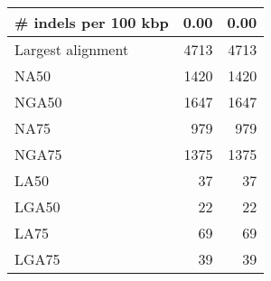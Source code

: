 \documentclass[12pt,a4paper]{article}
\begin{document}
\begin{table}[ht]
\begin{center}
\begin{tabular}{|l*{2}{|r}|}
\# indels per 100 kbp & 0.00 & 0.00 \\ \hline
Largest alignment & 4713 & 4713 \\ \hline
NA50 & 1420 & 1420 \\ \hline
NGA50 & 1647 & 1647 \\ \hline
NA75 & 979 & 979 \\ \hline
NGA75 & 1375 & 1375 \\ \hline
LA50 & 37 & 37 \\ \hline
LGA50 & 22 & 22 \\ \hline
LA75 & 69 & 69 \\ \hline
LGA75 & 39 & 39 \\ \hline
\end{tabular}
\end{center}
\end{table}
\end{document}
